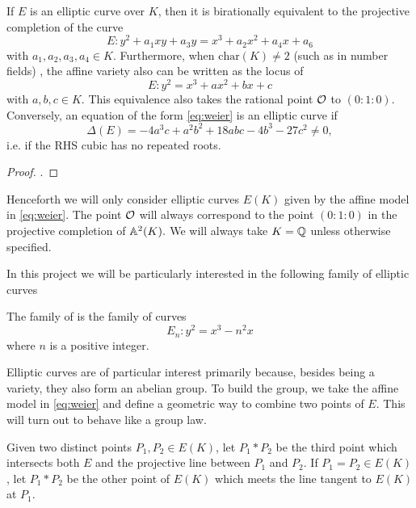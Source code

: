 \documentclass[12pt, a4paper]{report}
\begin{document}
\begin{prop}
  If $E$ is an elliptic curve over $K$, then it is birationally equivalent
  to the projective completion of the curve
  \begin{equation} \label{eq:weier2}
    E: y^2 + a_1xy + a_3y = x^3 + a_2x^2 + a_4x + a_6
  \end{equation}
  with $a_1, a_2, a_3, a_4 \in K.$
  Furthermore, when $\text{char}(K) \neq 2$ (such as in number fields)
  , the affine variety also can be written as the locus of
  \begin{equation} \label{eq:weier}
    E: y^2 = x^3 + ax^2 + bx + c
  \end{equation}
  with $a, b, c\in K$. This equivalence also takes the rational point ${\mathcal O}$ to
  $(0 : 1 : 0)$.
  Conversely, an equation of the form \ref{eq:weier} is an elliptic curve if
  \[\Delta(E) = -4a^3c + a^2b^2 + 18abc - 4b^3 - 27c^2 \neq 0,\]
  i.e. if the RHS cubic has no repeated roots.
\end{prop}

\begin{proof}
  \cite[See][Chapter III, pages 42-43]{arithmetic}.
\end{proof}

Henceforth we will only consider elliptic curves $E(K)$
given by the affine model in \autoref{eq:weier}. The
point ${\mathcal O}$ will always correspond to the point $(0:1:0)$ in the projective
completion of $\mathbb{A}^2(K).$
We will always take $K = {\mathbb Q}$ unless otherwise specified.

In this project we will be particularly interested in the following family
of elliptic curves

\begin{defn}
  The family of  is the family of curves
  \begin{equation} \label{eq:twist}
    E_n : y^2 = x^3 - n^2 x
  \end{equation}
  where $n$ is a positive integer.
\end{defn}

Elliptic curves are of particular interest primarily because, besides being
a variety, they also form an abelian group. To build the group, we take the
affine model in 
\autoref{eq:weier} and define a geometric way to combine two points of $E$. This
will turn out to behave like a group law.

Given two distinct points $P_1, P_2 \in E(K)$, let $P_1 * P_2$ be the third point
which intersects both $E$ and the projective line between $P_1$ and $P_2$. 
If $P_1 = P_2 \in E(K)$, let $P_1 * P_2$ be the other point of $E(K)$ which
meets the line tangent to $E(K)$ at $P_1.$
\end{document}
